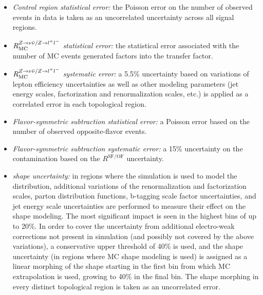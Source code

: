 \begin{itemize}
	\item {\it Control region statistical error:} the Poisson error on the number of observed events in \zll data is taken as an uncorrelated uncertainty across all signal regions.
	\item {\it $R_{\mathrm{MC}}^{Z\rightarrow\nu\bar{\nu}/Z\rightarrow l^+ l^-}$ statistical error:} the statistical error associated with the number of MC events generated factors into the transfer factor.
	\item {\it $R_{\mathrm{MC}}^{Z\rightarrow\nu\bar{\nu}/Z\rightarrow l^+ l^-}$ systematic error:} a 5.5\% uncertainty based on variations of lepton efficiency uncertainties as well as other modeling parameters (jet energy scales, factorization and renormalization scales, etc.) is applied as a correlated error in each topological region.
	\item {\it Flavor-symmetric subtraction statistical error:} a Poisson error based on the number of observed opposite-flavor events.
	\item {\it Flavor-symmetric subtraction systematic error:} a 15\% uncertainty on the \ttbar contamination based on the $R^{\mathrm{SF/OF}}$ uncertainty.
	\item {\it \mttwo shape uncertainty:} in regions where the simulation is used to model the \mttwo distribution, additional variations of the renormalization and factorization scales, parton distribution functions, b-tagging scale factor uncertainties, and jet energy scale uncertainties are performed to measure their effect on the \mttwo shape modeling. The most significant impact is seen in the highest \mttwo bins of up to 20\%. In order to cover the uncertainty from additional electro-weak corrections not present in simulation (and possibly not covered by the above variations), a conservative upper threshold of 40\% is used, and the shape uncertainty (in regions where MC \mttwo shape modeling is used) is assigned as a linear morphing of the \mttwo shape starting in the first bin from which MC extrapolation is used, growing to 40\% in the final bin. The shape morphing in every distinct topological region is taken as an uncorrelated error.
	
\end{itemize}


